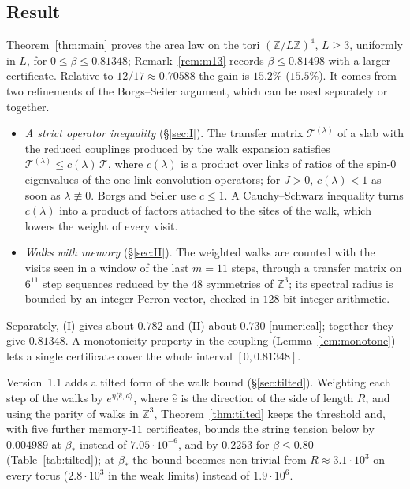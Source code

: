 \documentclass[11pt,a4paper]{article}
\theoremstyle{plain}
\theoremstyle{remark}
\numberwithin{equation}{section}
\newcommand{\Z}{\mathbb{Z}}
\newcommand{\cT}{\mathcal{T}}
\newcommand{\st}[1]{\textsf{[#1]}}
\begin{document}
\subsection{Result}
Theorem~\ref{thm:main} proves the area law on the tori $(\Z/L\Z)^4$, $L\ge3$, uniformly in $L$, for $0\le\beta\le0.81348$;
Remark~\ref{rem:m13} records $\beta\le0.81498$ with a larger certificate. Relative to $12/17\approx0.70588$ the gain is $15.2\%$
($15.5\%$). It comes from two refinements of the Borgs--Seiler argument, which can be used separately or together.
\begin{itemize}
\item[(I)] \emph{A strict operator inequality} (\S\ref{sec:I}). The transfer matrix $\cT^{(\lambda)}$ of a slab with the reduced
couplings produced by the walk expansion satisfies $\cT^{(\lambda)}\le c(\lambda)\,\cT$, where $c(\lambda)$ is a product over links
of ratios of the spin-$0$ eigenvalues of the one-link convolution operators; for $J>0$, $c(\lambda)<1$ as soon as
$\lambda\not\equiv0$. Borgs
and Seiler use $c\le1$. A Cauchy--Schwarz inequality turns $c(\lambda)$ into a product of factors attached to the sites of the walk,
which lowers the weight of every visit.
\item[(II)] \emph{Walks with memory} (\S\ref{sec:II}). The weighted walks are counted with the visits seen in a window of the last
$m=11$ steps, through a transfer matrix on $6^{11}$ step sequences reduced by the $48$ symmetries of $\Z^3$; its spectral radius is
bounded by an integer Perron vector, checked in $128$-bit integer arithmetic.
\end{itemize}
Separately, (I) gives about $0.782$ and (II) about $0.730$ \st{numerical}; together they give $0.81348$. A monotonicity property in
the coupling (Lemma~\ref{lem:monotone}) lets a single certificate cover the whole interval $[0,0.81348]$.

Version~1.1 adds a tilted form of the walk bound (\S\ref{sec:tilted}). Weighting each step of the walks by
$e^{\eta\langle\hat e,d\rangle}$, where $\hat e$ is the direction of the side of length $R$, and using the parity of walks in $\Z^3$,
Theorem~\ref{thm:tilted} keeps the threshold and, with five further memory-$11$ certificates, bounds the string tension below by
$0.004989$ at $\beta_*$ instead of $7.05\cdot10^{-6}$, and by $0.2253$ for $\beta\le0.80$ (Table~\ref{tab:tilted}); at $\beta_*$ the bound
becomes non-trivial from $R\approx3.1\cdot10^{3}$ on every torus ($2.8\cdot10^{3}$ in the weak limits) instead of $1.9\cdot10^{6}$.
\end{document}

